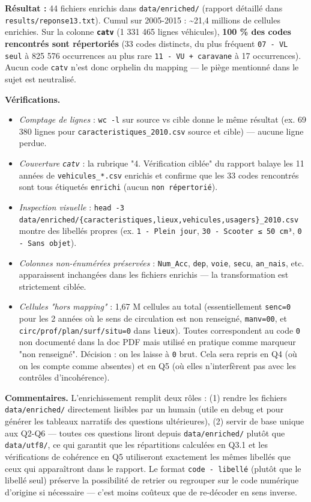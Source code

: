 \documentclass[11pt,a4paper]{article}
\newcommand{\rub}[2]{\textbf{\textcolor{#1}{#2}}}
\begin{document}
\rub{labresultat}{Résultat :} 44 fichiers enrichis dans \texttt{data/enriched/} (rapport détaillé dans \texttt{results/reponse13.txt}). Cumul sur 2005-2015 : \textasciitilde{}21,4 millions de cellules enrichies. Sur la colonne \textbf{\texttt{catv}} (1 331 465 lignes véhicules), \textbf{100 \% des codes rencontrés sont répertoriés} (33 codes distincts, du plus fréquent \texttt{07 - VL seul} à 825 576 occurrences au plus rare \texttt{11 - VU + caravane} à 17 occurrences). Aucun code \texttt{catv} n'est donc orphelin du mapping — le piège mentionné dans le sujet est neutralisé.

\rub{labanalyse}{Vérifications.}

\begin{itemize}
\item \emph{Comptage de lignes} : \texttt{wc -l} sur source vs cible donne le même résultat (ex. 69 380 lignes pour \texttt{caracteristiques\_2010.csv} source et cible) — aucune ligne perdue.
\item \emph{Couverture \texttt{catv}} : la rubrique "4. Vérification ciblée" du rapport balaye les 11 années de \texttt{vehicules\_*.csv} enrichis et confirme que les 33 codes rencontrés sont tous étiquetés \texttt{enrichi} (aucun \texttt{non répertorié}).
\item \emph{Inspection visuelle} : \texttt{head -3 data/enriched/\{caracteristiques,lieux,vehicules,usagers\}\_2010.csv} montre des libellés propres (ex. \texttt{1 - Plein jour}, \texttt{30 - Scooter ≤ 50 cm³}, \texttt{0 - Sans objet}).
\item \emph{Colonnes non-énumérées préservées} : \texttt{Num\_Acc}, \texttt{dep}, \texttt{voie}, \texttt{secu}, \texttt{an\_nais}, etc. apparaissent inchangées dans les fichiers enrichis — la transformation est strictement ciblée.
\item \emph{Cellules "hors mapping"} : 1,67 M cellules au total (essentiellement \texttt{senc=0} pour les 2 années où le sens de circulation est non renseigné, \texttt{manv=00}, et \texttt{circ/prof/plan/surf/situ=0} dans \texttt{lieux}). Toutes correspondent au code \texttt{0} non documenté dans la doc PDF mais utilisé en pratique comme marqueur "non renseigné". Décision : on les laisse à \texttt{0} brut. Cela sera repris en Q4 (où on les compte comme absentes) et en Q5 (où elles n'interfèrent pas avec les contrôles d'incohérence).
\end{itemize}

\rub{labcomment}{Commentaires.} L'enrichissement remplit deux rôles : (1) rendre les fichiers \texttt{data/enriched/} directement lisibles par un humain (utile en debug et pour générer les tableaux narratifs des questions ultérieures), (2) servir de base unique aux Q2-Q6 — toutes ces questions liront depuis \texttt{data/enriched/} plutôt que \texttt{data/utf8/}, ce qui garantit que les répartitions calculées en Q3.1 et les vérifications de cohérence en Q5 utiliseront exactement les mêmes libellés que ceux qui apparaîtront dans le rapport. Le format \texttt{code - libellé} (plutôt que le libellé seul) préserve la possibilité de retrier ou regrouper sur le code numérique d'origine si nécessaire — c'est moins coûteux que de re-décoder en sens inverse.
\end{document}
